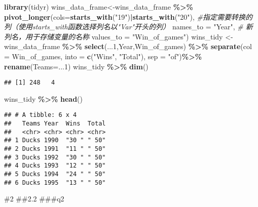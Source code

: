 \documentclass[
]{article}
\newenvironment{Shaded}{\begin{snugshade}}{\end{snugshade}}
\newcommand{\AttributeTok}[1]{\textcolor[rgb]{0.13,0.29,0.53}{#1}}
\newcommand{\CommentTok}[1]{\textcolor[rgb]{0.56,0.35,0.01}{\textit{#1}}}
\newcommand{\DecValTok}[1]{\textcolor[rgb]{0.00,0.00,0.81}{#1}}
\newcommand{\FunctionTok}[1]{\textcolor[rgb]{0.13,0.29,0.53}{\textbf{#1}}}
\newcommand{\NormalTok}[1]{#1}
\newcommand{\OtherTok}[1]{\textcolor[rgb]{0.56,0.35,0.01}{#1}}
\newcommand{\SpecialCharTok}[1]{\textcolor[rgb]{0.81,0.36,0.00}{\textbf{#1}}}
\newcommand{\StringTok}[1]{\textcolor[rgb]{0.31,0.60,0.02}{#1}}
\begin{document}
\begin{Shaded}
\begin{Highlighting}[]
\FunctionTok{library}\NormalTok{(tidyr)}
\NormalTok{wins\_data\_frame}\OtherTok{\textless{}{-}}\NormalTok{wins\_data\_frame }\SpecialCharTok{\%\textgreater{}\%}
  \FunctionTok{pivot\_longer}\NormalTok{(}\AttributeTok{cols=}\FunctionTok{starts\_with}\NormalTok{(}\StringTok{"19"}\NormalTok{)}\SpecialCharTok{|}\FunctionTok{starts\_with}\NormalTok{(}\StringTok{"20"}\NormalTok{),   }\CommentTok{\#指定需要转换的列（使用starts\_with函数选择列名以"Var"开头的列）}
               \AttributeTok{names\_to =} \StringTok{"Year"}\NormalTok{,        }\CommentTok{\# 新列名，用于存储变量的名称}
               \AttributeTok{values\_to =} \StringTok{"Win\_of\_games"}\NormalTok{)}
\NormalTok{wins\_tidy }\OtherTok{\textless{}{-}}\NormalTok{ wins\_data\_frame }\SpecialCharTok{\%\textgreater{}\%}
  \FunctionTok{select}\NormalTok{(...}\DecValTok{1}\NormalTok{,Year,Win\_of\_games) }\SpecialCharTok{\%\textgreater{}\%}
  \FunctionTok{separate}\NormalTok{(}\AttributeTok{col =}\NormalTok{ Win\_of\_games, }\AttributeTok{into =} \FunctionTok{c}\NormalTok{(}\StringTok{"Wins"}\NormalTok{, }\StringTok{"Total"}\NormalTok{), }\AttributeTok{sep =} \StringTok{"of"}\NormalTok{)}\SpecialCharTok{\%\textgreater{}\%}
  \FunctionTok{rename}\NormalTok{(}\AttributeTok{Teams=}\NormalTok{...}\DecValTok{1}\NormalTok{)}
\NormalTok{wins\_tidy }\SpecialCharTok{\%\textgreater{}\%} \FunctionTok{dim}\NormalTok{()}
\end{Highlighting}
\end{Shaded}

\begin{verbatim}
## [1] 248   4
\end{verbatim}

\begin{Shaded}
\begin{Highlighting}[]
\NormalTok{wins\_tidy }\SpecialCharTok{\%\textgreater{}\%} \FunctionTok{head}\NormalTok{()}
\end{Highlighting}
\end{Shaded}

\begin{verbatim}
## # A tibble: 6 x 4
##   Teams Year  Wins  Total
##   <chr> <chr> <chr> <chr>
## 1 Ducks 1990  "30 " " 50"
## 2 Ducks 1991  "11 " " 50"
## 3 Ducks 1992  "30 " " 50"
## 4 Ducks 1993  "12 " " 50"
## 5 Ducks 1994  "24 " " 50"
## 6 Ducks 1995  "13 " " 50"
\end{verbatim}

\#2 \#\#2.2 \#\#\#q2
\end{document}

